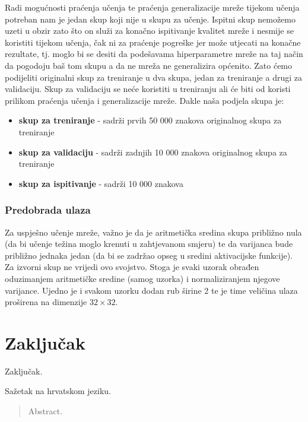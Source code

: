 \documentclass[times, utf8, zavrsni, numeric]{fer}
\begin{document}
Radi mogućnosti praćenja učenja te praćenja generalizacije mreže tijekom učenja potreban nam je jedan skup koji nije u skupu za učenje. Ispitni skup nemožemo uzeti u obzir zato što on služi za konačno ispitivanje kvalitet mreže i nesmije se koristiti tijekom učenja, čak ni za praćenje pogreške jer može utjecati na konačne rezultate, tj. moglo bi se desiti da podešavama hiperparametre mreže na taj način da pogodoju baš tom skupu a da ne mreža ne generalizira općenito. Zato ćemo podijeliti originalni skup za treniranje u dva skupa, jedan za treniranje a drugi za validaciju. Skup za validaciju se neće koristiti u treniranju ali će biti od koristi prilikom praćenja učenja i generalizacije mreže. Dakle naša podjela skupa je:
\begin{itemize}
\item \textbf{skup za treniranje} - sadrži prvih 50 000 znakova originalnog skupa za treniranje
\item \textbf{skup za validaciju} - sadrži zadnjih 10 000 znakova originalnog skupa za treniranje
\item \textbf{skup za ispitivanje} - sadrži 10 000 znakova
\end{itemize}

\subsection{Predobrada ulaza}
Za uspješno učenje mreže, važno je da je aritmetička sredina skupa približno nula (da
bi učenje težina moglo krenuti u zahtjevanom smjeru) te da varijanca bude
približno jednaka jedan (da bi se zadržao opseg u sredini aktivacijske funkcije).
Za izvorni skup ne vrijedi ovo svojstvo. Stoga je svaki uzorak obrađen oduzimanjem 
aritmetičke sredine (samog uzorka) i normaliziranjem njegove varijance. Ujedno je i svakom uzorku dodan rub širine 2 te je time veličina ulaza proširena na dimenzije $32 \times 32$.


\chapter{Zaključak}
Zaključak.




\begin{sazetak}
Sažetak na hrvatskom jeziku.

\end{sazetak}

\begin{abstract}
Abstract.

\end{abstract}
\end{document}
